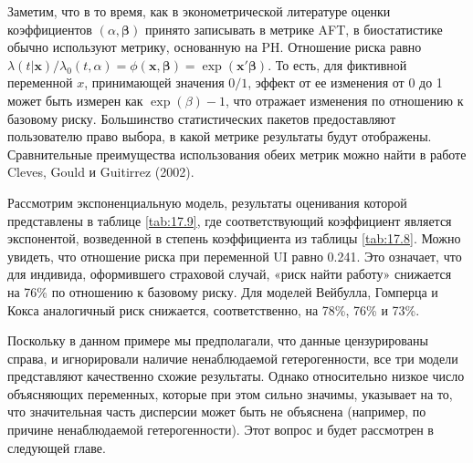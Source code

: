 Заметим, что в то время, как в эконометрической литературе оценки коэффициентов $(\alpha,\bm{\beta})$ принято записывать в метрике AFT, в биостатистике обычно используют метрику, основанную на PH. Отношение риска равно $\lambda(t|\mathbf{x})/\lambda_0(t,\alpha)=\phi(\mathbf{x},\bm{\beta})=\exp(\mathbf{x}'\bm{\beta})$. То есть, для фиктивной переменной $x$, принимающей значения $0/1$, эффект от ее изменения от 0 до 1 может быть измерен как $\exp(\beta)-1$, что отражает изменения по отношению к базовому риску. Большинство статистических пакетов предоставляют пользователю право выбора, в какой метрике результаты будут отображены. Сравнительные преимущества использования обеих метрик можно найти в работе Cleves, Gould и Guitirrez (2002).

Рассмотрим экспоненциальную модель, результаты оценивания которой представлены в таблице \ref{tab:17.9}, где соответствующий коэффициент является экспонентой, возведенной в степень коэффициента из таблицы \ref{tab:17.8}. Можно увидеть, что отношение риска при переменной UI равно 0.241. Это означает, что для индивида, оформившего страховой случай, «риск найти работу» снижается на 76\% по отношению к базовому риску. Для моделей Вейбулла, Гомперца и Кокса аналогичный риск снижается, соответственно, на 78\%, 76\% и 73\%.

Поскольку в данном примере мы предполагали, что данные цензурированы справа, и игнорировали наличие ненаблюдаемой гетерогенности, все три модели представляют качественно схожие результаты. Однако относительно низкое число объясняющих переменных, которые при этом сильно значимы, указывает на то, что значительная часть дисперсии может быть не объяснена (например, по причине ненаблюдаемой гетерогенности). Этот вопрос и будет рассмотрен в следующей главе.



